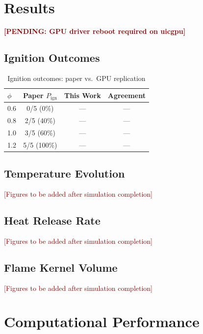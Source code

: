 \documentclass[11pt]{article}
\begin{document}
\section{Results}

\textcolor{darkred}{\textbf{[PENDING: GPU driver reboot required on uicgpu]}}

\subsection{Ignition Outcomes}
\begin{table}[H]
\centering
\caption{Ignition outcomes: paper vs.\ GPU replication}
\label{tab:ignition}
\begin{tabular}{@{}lccc@{}}
\toprule
$\phi$ & \textbf{Paper $P_\mathrm{ign}$} & \textbf{This Work} & \textbf{Agreement} \\
\midrule
0.6 & 0/5 (0\%) & --- & --- \\
0.8 & 2/5 (40\%) & --- & --- \\
1.0 & 3/5 (60\%) & --- & --- \\
1.2 & 5/5 (100\%) & --- & --- \\
\bottomrule
\end{tabular}
\end{table}

\subsection{Temperature Evolution}
\textcolor{darkred}{[Figures to be added after simulation completion]}

\subsection{Heat Release Rate}
\textcolor{darkred}{[Figures to be added after simulation completion]}

\subsection{Flame Kernel Volume}
\textcolor{darkred}{[Figures to be added after simulation completion]}

\section{Computational Performance}
\end{document}
